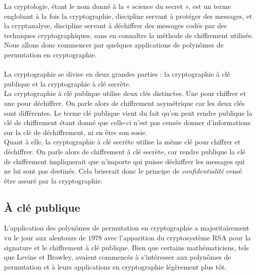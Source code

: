 \documentclass[12pt]{article}
\theoremstyle{remark}\newtheorem{note}{Note}
\theoremstyle{remark}\newtheorem{nota}{Notation}
\theoremstyle{definition}
\begin{document}
La cryptologie, étant le nom donné à la « science du secret », est un terme englobant à la fois la cryptographie, discipline servant à protéger des messages, et la cryptanalyse, discipline servant à déchiffrer des messages codés par des techniques cryptographiques, sans en connaître la méthode de chiffrement utilisée.\\
Nous allons donc commencer par quelques applications de polynômes de permutation en cryptographie.\\\\
La cryptographie se divise en deux grandes parties : la cryptographie à clé publique et la cryptographie à clé secrète.\\
La cryptographie à clé publique utilise deux clés distinctes. Une pour chiffrer et une pour déchiffrer. On parle alors de chiffrement asymétrique car les deux clés sont différentes. Le terme clé publique vient du fait qu'on peut rendre publique la clé de chiffrement étant donné que celle-ci n'est pas censée donner d'informations sur la clé de déchiffrement, ni en être son sosie.\\
Quant à elle, la cryptographie à clé secrète utilise la même clé pour chiffrer et déchiffrer. On parle alors de chiffrement à clé secrète, car rendre publique la clé de chiffrement impliquerait que n'importe qui puisse déchiffrer les messages qui ne lui sont pas destinés. Cela briserait donc le principe de \textit{confidentialité} censé être assuré par la cryptographie.
\subsection{À clé publique}

L'application des polynômes de permutation en cryptographie a majoritairement vu le jour aux alentours de $1978$ avec l'apparition du cryptosystème RSA pour la signature et le chiffrement à clé publique. Bien que certains mathématiciens, tels que Levine et Brawley, avaient commencés à s'intéresser aux polynômes de permutation et à leurs applications en cryptographie légèrement plus tôt.
\end{document}
